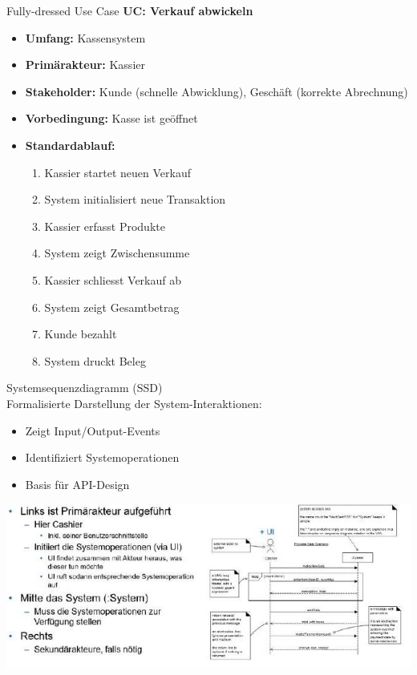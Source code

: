 \begin{example2}{Fully-dressed Use Case}
\textbf{UC: Verkauf abwickeln}
\begin{itemize}
    \item \textbf{Umfang:} Kassensystem
    \item \textbf{Primärakteur:} Kassier
    \item \textbf{Stakeholder:} Kunde (schnelle Abwicklung), Geschäft (korrekte Abrechnung)
    \item \textbf{Vorbedingung:} Kasse ist geöffnet
    \item \textbf{Standardablauf:}
    \begin{enumerate}
        \item Kassier startet neuen Verkauf
        \item System initialisiert neue Transaktion
        \item Kassier erfasst Produkte
        \item System zeigt Zwischensumme
        \item Kassier schliesst Verkauf ab
        \item System zeigt Gesamtbetrag
        \item Kunde bezahlt
        \item System druckt Beleg
    \end{enumerate}
\end{itemize}
\end{example2}

\begin{concept}{Systemsequenzdiagramm (SSD)}\\
Formalisierte Darstellung der System-Interaktionen:
\begin{itemize}
    \item Zeigt Input/Output-Events
    \item Identifiziert Systemoperationen
    \item Basis für API-Design
\end{itemize}
\includegraphics[width=\linewidth]{images/2024_12_29_0d1d7b5551ea1b4b41bdg-06}
\end{concept}

